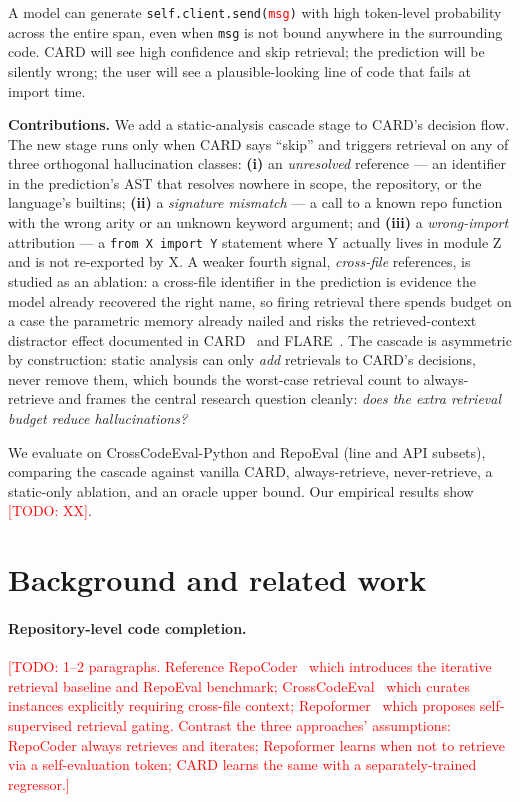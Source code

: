 \documentclass[10pt,twocolumn]{article}
\newcommand{\todo}[1]{\textcolor{red}{[TODO: #1]}}
\begin{document}
A model can generate \texttt{self.client.send(\textcolor{red}{msg})} with
high token-level probability across the entire span, even when
\texttt{msg} is not bound anywhere in the surrounding code. CARD will see
high confidence and skip retrieval; the prediction will be silently
wrong; the user will see a plausible-looking line of code that fails at
import time.

\textbf{Contributions.} We add a static-analysis cascade stage to CARD's
decision flow. The new stage runs only when CARD says ``skip'' and triggers
retrieval on any of three orthogonal hallucination classes:
\textbf{(i)} an \emph{unresolved} reference --- an identifier in the
prediction's AST that resolves nowhere in scope, the repository, or the
language's builtins; \textbf{(ii)} a \emph{signature mismatch} --- a call
to a known repo function with the wrong arity or an unknown keyword
argument; and \textbf{(iii)} a \emph{wrong-import} attribution --- a
\texttt{from X import Y} statement where Y actually lives in module Z and
is not re-exported by X. A weaker fourth signal, \emph{cross-file}
references, is studied as an ablation: a cross-file identifier in the
prediction is evidence the model already recovered the right name, so
firing retrieval there spends budget on a case the parametric memory
already nailed and risks the retrieved-context distractor effect
documented in CARD~\cite{zhang2024card} and FLARE~\cite{jiang2023flare}.
The cascade is asymmetric by construction: static analysis can only
\emph{add} retrievals to CARD's decisions, never remove them, which bounds
the worst-case retrieval count to always-retrieve and frames the central
research question cleanly: \emph{does the extra retrieval budget reduce
hallucinations?}

We evaluate on CrossCodeEval-Python and RepoEval (line and API
subsets), comparing the cascade against vanilla CARD, always-retrieve,
never-retrieve, a static-only ablation, and an oracle upper bound. Our
empirical results show \todo{XX}.

\section{Background and related work}

\paragraph{Repository-level code completion.} \todo{1--2 paragraphs.
Reference RepoCoder~\cite{zhang2023repocoder} which introduces the iterative
retrieval baseline and RepoEval benchmark; CrossCodeEval~\cite{ding2023cce}
which curates instances explicitly requiring cross-file context;
Repoformer~\cite{wu2024repoformer} which proposes self-supervised retrieval
gating. Contrast the three approaches' assumptions: RepoCoder always
retrieves and iterates; Repoformer learns when not to retrieve via a
self-evaluation token; CARD learns the same with a separately-trained
regressor.}
\end{document}
